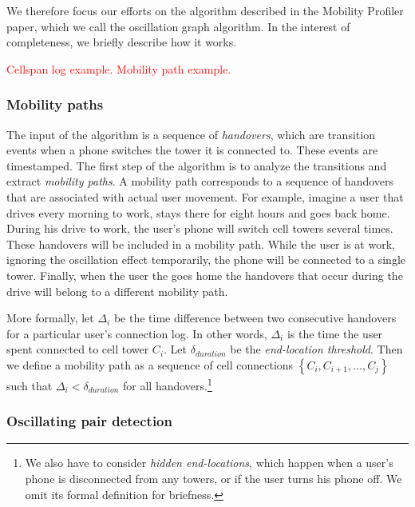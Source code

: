 \documentclass[letterpaper, 11pt, conference]{ieeeconf}
\newcommand{\xxx}[1]{\textcolor{red}{#1}}
\begin{document}
We therefore focus our efforts on the algorithm described in the Mobility Profiler paper, which we call the oscillation graph algorithm. In the interest of completeness, we briefly describe how it works.

\xxx{Cellspan log example. Mobility path example.}

\subsubsection{Mobility paths}
The input of the algorithm is a sequence of \textit{handovers}, which are transition events when a phone switches the tower it is connected to. These events are timestamped. The first step of the algorithm is to analyze the transitions and extract \textit{mobility paths}.  A mobility path corresponds to a sequence of handovers that are associated with actual user movement. For example, imagine a user that drives every morning to work, stays there for eight hours and goes back home. During his drive to work, the user's phone will switch cell towers several times. These handovers will be included in a mobility path. While the user is at work, ignoring the oscillation effect temporarily, the phone will be connected to a single tower. Finally, when the user the goes home the handovers that occur during the drive will belong to a different mobility path.

More formally, let $\Delta_i$ be the time difference between two consecutive handovers for a particular user's connection log. In other words, $\Delta_i$ is the time the user spent connected to cell tower $C_i$. Let $\delta_{duration}$ be the \textit{end-location threshold}. Then we define a mobility path as a sequence of cell connections $\left\{C_i, C_{i+1}, \ldots, C_j\right\}$ such that $\Delta_i < \delta_{duration}$ for all handovers.\footnote{We also have to consider \textit{hidden end-locations}, which happen when a user's phone is disconnected from any towers, or if the user turns his phone off. We omit its formal definition for briefness.}


\subsubsection{Oscillating pair detection}
\end{document}
